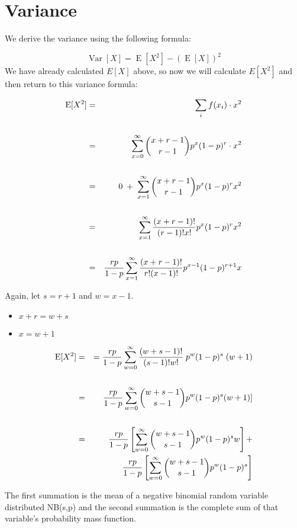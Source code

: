 \documentclass[a4paper,12pt]{article}
\begin{document}
\section*{Variance}
We derive the variance using the following formula:

\[\operatorname{Var}[X] = \operatorname{E}[X^2] - (\operatorname{E}[X])^2\]
We have already calculated $E[X]$ above, so now we will calculate $E[X^2]$ and then return to this variance formula:

\begin{eqnarray*}
\operatorname{E}[X^2] &=& \sum_i f(x_i) \cdot x^2\\
& & \\
&=&\sum_{x=0}^\infty {x+r-1 \choose r-1} p^x (1-p)^r \cdot x^2\\
& & \\
&=& 0 \;+\; \sum_{x=1}^\infty {x+r-1 \choose r-1} p^x (1-p)^r x^2\\
& & \\
&=& \sum_{x=1}^\infty {(x+r-1)! \over (r-1)!x!} p^x (1-p)^r x^2\\
& & \\
&=& {rp \over 1-p}\sum_{x=1}^\infty {(x+r-1)! \over r!(x-1)!} p^{x-1} (1-p)^{r+1} x\\
\end{eqnarray*}

\noindent Again, let $s = r+1$ and $w=x-1$.

\begin{itemize}
    \item $x+r = w+s$
    \item $x = w+1$
\end{itemize}

\begin{eqnarray*}
\operatorname{E}[X^2] &=&  = {rp \over 1-p}\sum_{w=0}^\infty {(w+s-1)! \over (s-1)!w!}\; p^w (1-p)^s \;(w+1)\\
& & \\
&=& {rp \over 1-p}\sum_{w=0}^\infty {w+s-1 \choose s-1} p^w (1-p)^s (w+1)]\\
& & \\
&=& {rp \over 1-p}\left[\sum_{w=0}^\infty {w+s-1 \choose s-1} p^w (1-p)^s w  \right]  + \\
& & {rp \over 1-p}\left[\sum_{w=0}^\infty {w+s-1 \choose s-1} p^w (1-p)^s \right] \\
\end{eqnarray*}

\medskip
\noindent The first summation is the mean of a negative binomial random variable distributed NB(s,p) and the second summation is the complete sum of that variable's probability mass function.
\end{document}
